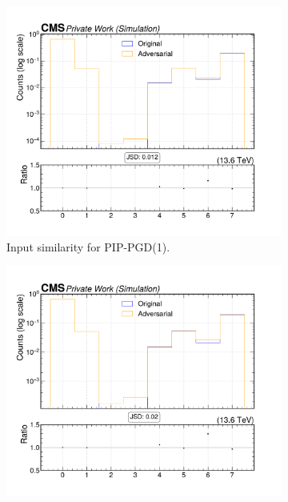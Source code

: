 \begin{figure}[htbp]
  \centering
  \begin{subfigure}[t]{0.32\textwidth}
    \includegraphics[width=\linewidth]{media/output/features/compare/combined_it_1/cmp_cpf_arr_Cpfcan_VTX_ass.pdf}
    \caption*{Input similarity for PIP-PGD(1).}
  \end{subfigure}\hfill
  \begin{subfigure}[t]{0.32\textwidth}
    \includegraphics[width=\linewidth]{media/output/features/compare/combined_it_2/cmp_cpf_arr_Cpfcan_VTX_ass.pdf}

\end{subfigure}
\end{figure}
